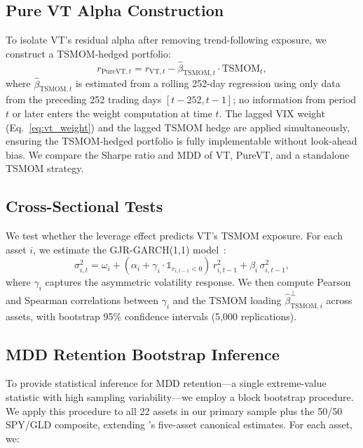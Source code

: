 \subsection{Pure VT Alpha Construction}

To isolate VT's residual alpha after removing trend-following exposure, we construct a TSMOM-hedged portfolio:
\begin{equation}
r_{\text{PureVT},t} = r_{\text{VT},t} - \hat{\beta}_{\text{TSMOM},t} \cdot \text{TSMOM}_t,
\label{eq:pure_vt}
\end{equation}
where $\hat{\beta}_{\text{TSMOM},t}$ is estimated from a rolling 252-day regression using only data from the preceding 252 trading days $[t-252, t-1]$; no information from period $t$ or later enters the weight computation at time $t$. The lagged VIX weight (Eq.~\ref{eq:vt_weight}) and the lagged TSMOM hedge are applied simultaneously, ensuring the TSMOM-hedged portfolio is fully implementable without look-ahead bias. We compare the Sharpe ratio and MDD of VT, PureVT, and a standalone TSMOM strategy.

\subsection{Cross-Sectional Tests}

We test whether the leverage effect predicts VT's TSMOM exposure. For each asset $i$, we estimate the GJR-GARCH(1,1) model~\citep{glosten1993}:
\begin{equation}
\sigma_{i,t}^2 = \omega_i + (\alpha_i + \gamma_i \cdot \mathbb{1}_{r_{i,t-1}<0}) \, r_{i,t-1}^2 + \beta_i \, \sigma_{i,t-1}^2,
\label{eq:gjr}
\end{equation}
where $\gamma_i$ captures the asymmetric volatility response. We then compute Pearson and Spearman correlations between $\gamma_i$ and the TSMOM loading $\hat{\beta}_{\text{TSMOM},i}^{\perp}$ across assets, with bootstrap 95\% confidence intervals (5,000 replications).

\subsection{MDD Retention Bootstrap Inference}

To provide statistical inference for MDD retention---a single extreme-value statistic with high sampling variability---we employ a block bootstrap procedure. We apply this procedure to all 22 assets in our primary sample plus the 50/50 SPY/GLD composite, extending 's five-asset canonical estimates. For each asset, we:

